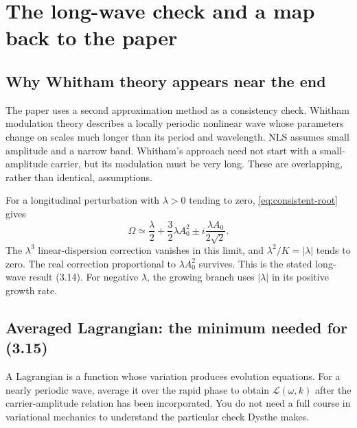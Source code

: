 \section{The long-wave check and a map back to the paper}
\label{sec:reading}
\subsection{Why Whitham theory appears near the end}
The paper uses a second approximation method as a consistency check.
Whitham modulation theory describes a locally periodic nonlinear wave
whose parameters change on scales much longer than its period and
wavelength. NLS assumes small amplitude and a narrow band. Whitham's
approach need not start with a small-amplitude carrier, but its modulation
must be very long. These are overlapping, rather than identical, assumptions.

For a longitudinal perturbation with $\lambda>0$ tending to zero,
\eqref{eq:consistent-root} gives
\begin{equation}\label{eq:long-wave}
 \Omega\simeq\frac\lambda2+\frac32\lambda A_0^2
              \mathbin{\pm}i\frac{\lambda A_0}{2\sqrt2}.
\end{equation}
The $\lambda^3$ linear-dispersion correction vanishes in this limit, and
$\lambda^2/K=|\lambda|$ tends to zero. The real correction proportional
to $\lambda A_0^2$ survives. This is the stated long-wave result (3.14).
For negative $\lambda$, the growing branch uses $|\lambda|$ in its
positive growth rate.

\subsection{Averaged Lagrangian: the minimum needed for (3.15)}
A Lagrangian is a function whose variation produces evolution equations.
For a nearly periodic wave, average it over the rapid phase to obtain
$\mathcal{L}(\omega,k)$ after the carrier-amplitude relation has been
incorporated. You do not need a full course in variational mechanics to
understand the particular check Dysthe makes.

